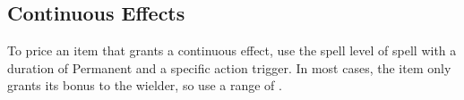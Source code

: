 \subsection{Continuous Effects} 
To price an item that grants a continuous effect, use the spell level of spell with a duration of Permanent and a specific action trigger. In most cases, the item only grants its bonus to the wielder, so use a range of \rngpers.
